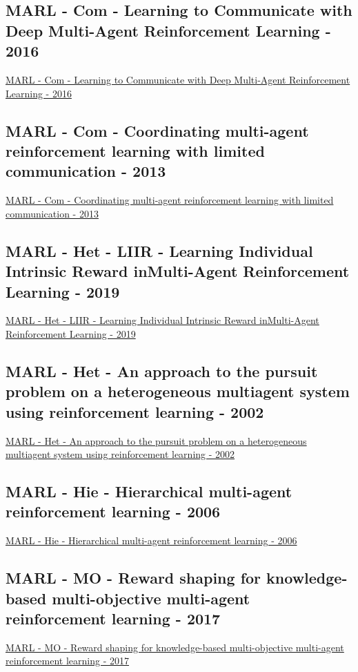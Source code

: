 \subsection{MARL - Com - Learning to Communicate with Deep Multi-Agent Reinforcement Learning - 2016}
\href{https://arxiv.org/abs/1605.06676}{MARL - Com - Learning to Communicate with Deep Multi-Agent Reinforcement Learning - 2016}

\subsection{MARL - Com - Coordinating multi-agent reinforcement learning with limited communication - 2013}
\href{https://dl.acm.org/doi/abs/10.5555/2484920.2485093}{MARL - Com - Coordinating multi-agent reinforcement learning with limited communication - 2013}

\subsection{MARL - Het - LIIR - Learning Individual Intrinsic Reward inMulti-Agent Reinforcement Learning - 2019}
\href{https://proceedings.neurips.cc/paper/2019/hash/07a9d3fed4c5ea6b17e80258dee231fa-Abstract.html}{MARL - Het - LIIR - Learning Individual Intrinsic Reward inMulti-Agent Reinforcement Learning - 2019}

\subsection{MARL - Het - An approach to the pursuit problem on a heterogeneous multiagent system using reinforcement learning - 2002}
\href{https://www.sciencedirect.com/science/article/abs/pii/S092188900300040X}{MARL - Het - An approach to the pursuit problem on a heterogeneous multiagent system using reinforcement learning - 2002}

\subsection{MARL - Hie - Hierarchical multi-agent reinforcement learning - 2006}
\href{https://link.springer.com/article/10.1007/s10458-006-7035-4}{MARL - Hie - Hierarchical multi-agent reinforcement learning - 2006}

\subsection{MARL - MO - Reward shaping for knowledge-based multi-objective multi-agent reinforcement learning - 2017}
\href{https://www.cambridge.org/core/journals/knowledge-engineering-review/article/reward-shaping-for-knowledgebased-multiobjective-multiagent-reinforcement-learning/75F1507F7CAC7C6625F87AE7CD344D52}{MARL - MO - Reward shaping for knowledge-based multi-objective multi-agent reinforcement learning - 2017}

